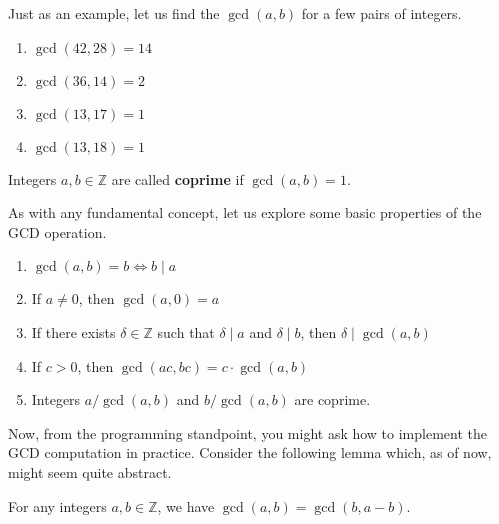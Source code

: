 \documentclass[../lecture-notes-148x210.tex]{subfiles}
\begin{document}
\begin{example}
    Just as an example, let us find the $\gcd(a, b)$ for a few pairs of integers.
    
    \begin{xmulticols}{2}
        \begin{enumerate}
            \item $\gcd(42, 28) = 14$
            \item $\gcd(36, 14) = 2$
            \item $\gcd(13, 17) = 1$
            \item $\gcd(13, 18) = 1$
        \end{enumerate}
    \end{xmulticols}
\end{example}

\begin{definition}
    Integers $a, b \in \mathbb{Z}$ are called \textbf{coprime} if $\gcd(a, b) = 1$.
\end{definition}

As with any fundamental concept, let us explore some basic properties of the GCD operation.

\begin{lemma}\label{lemma:gcd_properties}
    \hfil
    \begin{enumerate}
        \item $\gcd(a, b) = b \iff b \mid a$
        \item If $a \neq 0$, then $\gcd(a, 0) = a$
        \item If there exists $\delta \in \mathbb{Z}$ such that $\delta \mid a$ and $\delta \mid b$, then $\delta \mid \gcd(a, b)$
        \item If $c > 0$, then $\gcd(ac, bc) = c \cdot \gcd(a, b)$
        \item Integers $a/\gcd(a,b)$ and $b/\gcd(a,b)$ are coprime.
    \end{enumerate}
\end{lemma}

Now, from the programming standpoint, you might ask how to implement the GCD 
computation in practice. Consider the following lemma which, as of now, might 
seem quite abstract.

\begin{lemma} \label{lemma:gcd_basic_calculation}
    For any integers $a,b \in \mathbb{Z}$, we have $\gcd(a, b) = \gcd(b, a - b)$. 
\end{lemma}
\end{document}
